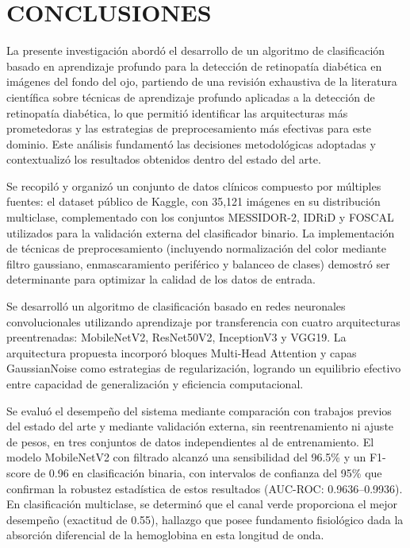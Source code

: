 
\chapter{CONCLUSIONES}

La presente investigación abordó el desarrollo de un algoritmo de clasificación basado en
aprendizaje profundo para la detección de retinopatía diabética en imágenes del fondo del
ojo, partiendo de una revisión exhaustiva de la literatura científica sobre técnicas de
aprendizaje profundo aplicadas a la detección de retinopatía diabética, lo que permitió
identificar las arquitecturas más prometedoras y las estrategias de preprocesamiento más
efectivas para este dominio. Este análisis fundamentó las decisiones metodológicas
adoptadas y contextualizó los resultados obtenidos dentro del estado del arte.

Se recopiló y organizó un conjunto de datos clínicos compuesto por múltiples fuentes: el
dataset público de Kaggle, con 35{,}121 imágenes en su distribución multiclase,
complementado con los conjuntos MESSIDOR-2, IDRiD y FOSCAL utilizados para la validación
externa del clasificador binario. La implementación de
técnicas de preprocesamiento (incluyendo normalización del color mediante filtro
gaussiano, enmascaramiento periférico y balanceo de clases) demostró ser determinante
para optimizar la calidad de los datos de entrada.

Se desarrolló un algoritmo de clasificación basado en redes neuronales convolucionales
utilizando aprendizaje por transferencia con cuatro arquitecturas preentrenadas:
MobileNetV2, ResNet50V2, InceptionV3 y VGG19. La arquitectura propuesta incorporó bloques
Multi-Head Attention y capas GaussianNoise como estrategias de regularización, logrando un
equilibrio efectivo entre capacidad de generalización y eficiencia computacional.

Se evaluó el desempeño del sistema mediante comparación con trabajos previos del estado
del arte y mediante validación externa, sin reentrenamiento ni ajuste de pesos, en tres
conjuntos de datos independientes al de entrenamiento. El modelo MobileNetV2 con filtrado alcanzó
una sensibilidad del 96.5\% y un F1-score de 0.96 en clasificación binaria, con intervalos
de confianza del 95\% que confirman la robustez estadística de estos resultados (AUC-ROC:
0.9636--0.9936). En clasificación multiclase, se determinó que el canal verde proporciona
el mejor desempeño (exactitud de 0.55), hallazgo que posee fundamento fisiológico dada la
absorción diferencial de la hemoglobina en esta longitud de onda.

